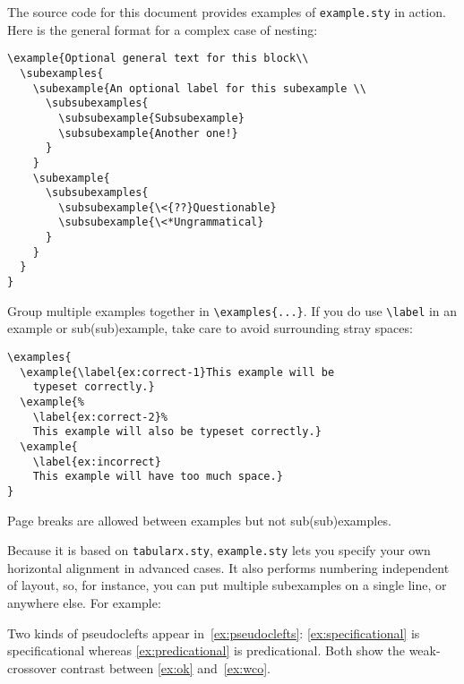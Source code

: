 \documentclass[lucida,final]{sp}
\newcommand{\spfile}[1]{\texttt{#1}}
\newcommand{\cmd}[1]{\texttt{\textbackslash#1}}
\begin{document}
The source code for this document provides examples of
\spfile{example.sty} in action.  Here is the general format for a
complex case of nesting:
%
\begin{Verbatim}
\example{Optional general text for this block\\
  \subexamples{
    \subexample{An optional label for this subexample \\
      \subsubexamples{
        \subsubexample{Subsubexample}
        \subsubexample{Another one!}
      }
    }      
    \subexample{
      \subsubexamples{ 
        \subsubexample{\<{??}Questionable}
        \subsubexample{\<*Ungrammatical}
      }
    } 
  }
}
\end{Verbatim}
%
Group multiple examples together in \verb+\examples{...}+.  If you do
use \cmd{label} in an example or sub(sub)example, take care to avoid
surrounding stray spaces:
%
\begin{Verbatim}
\examples{
  \example{\label{ex:correct-1}This example will be
    typeset correctly.}
  \example{%
    \label{ex:correct-2}%
    This example will also be typeset correctly.}
  \example{
    \label{ex:incorrect}
    This example will have too much space.}
}
\end{Verbatim}
%
Page breaks are allowed between examples but not sub(sub)examples.

Because it is based on \spfile{tabularx.sty}, \spfile{example.sty}
lets you specify your own horizontal alignment in advanced cases.  It
also performs numbering independent of layout, so, for instance, you
can put multiple subexamples on a single line, or anywhere else.  For
example:

Two kinds of pseudoclefts appear in~\eqref{ex:pseudoclefts}:
\eqref{ex:specificational} is specificational whereas
\eqref{ex:predicational} is predicational.
Both show the weak-crossover contrast between
\eqref{ex:ok} and~\eqref{ex:wco}.
\end{document}
